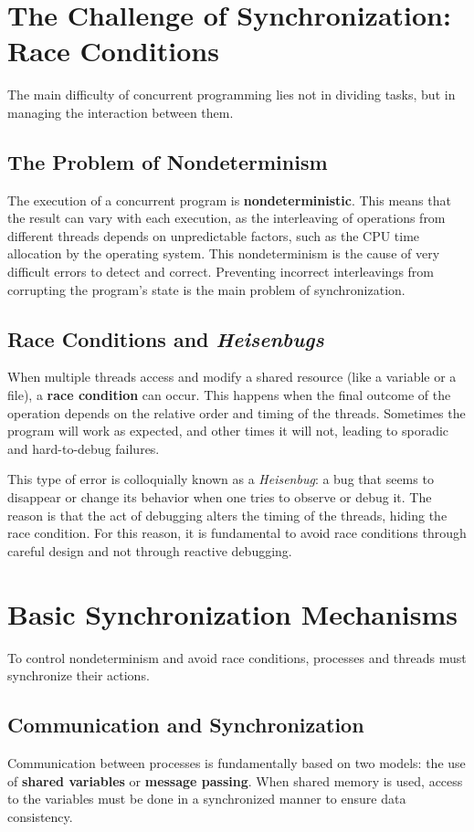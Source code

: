 \section{The Challenge of Synchronization: Race Conditions}
The main difficulty of concurrent programming lies not in dividing tasks, but in managing the interaction between them.

\subsection{The Problem of Nondeterminism}
The execution of a concurrent program is \textbf{nondeterministic}. This means that the result can vary with each execution, as the interleaving of operations from different threads depends on unpredictable factors, such as the CPU time allocation by the operating system. This nondeterminism is the cause of very difficult errors to detect and correct. Preventing incorrect interleavings from corrupting the program's state is the main problem of synchronization.

\subsection{Race Conditions and \textit{Heisenbugs}}
When multiple threads access and modify a shared resource (like a variable or a file), a \textbf{race condition} can occur. This happens when the final outcome of the operation depends on the relative order and timing of the threads. Sometimes the program will work as expected, and other times it will not, leading to sporadic and hard-to-debug failures.

This type of error is colloquially known as a \textit{Heisenbug}: a bug that seems to disappear or change its behavior when one tries to observe or debug it. The reason is that the act of debugging alters the timing of the threads, hiding the race condition. For this reason, it is fundamental to avoid race conditions through careful design and not through reactive debugging.

\section{Basic Synchronization Mechanisms}
To control nondeterminism and avoid race conditions, processes and threads must synchronize their actions.

\subsection{Communication and Synchronization}
Communication between processes is fundamentally based on two models: the use of \textbf{shared variables} or \textbf{message passing}. When shared memory is used, access to the variables must be done in a synchronized manner to ensure data consistency.

